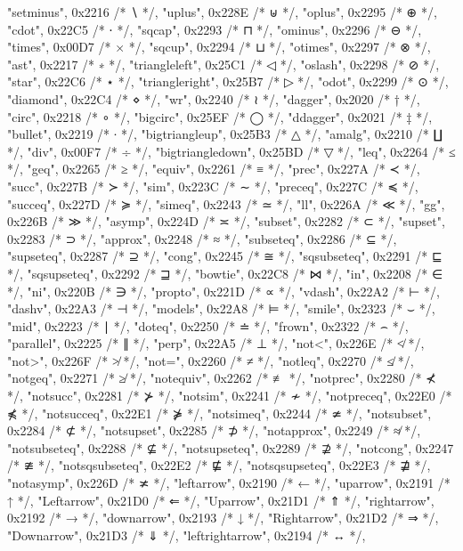 	{"setminus", 0x2216 /* ∖ */},
	{"uplus", 0x228E /* ⊎ */},
	{"oplus", 0x2295 /* ⊕ */},
	{"cdot", 0x22C5 /* ⋅ */},
	{"sqcap", 0x2293 /* ⊓ */},
	{"ominus", 0x2296 /* ⊖ */},
	{"times", 0x00D7 /* × */},
	{"sqcup", 0x2294 /* ⊔ */},
	{"otimes", 0x2297 /* ⊗ */},
	{"ast", 0x2217 /* ∗ */},
	{"triangleleft", 0x25C1 /* ◁ */},
	{"oslash", 0x2298 /* ⊘ */},
	{"star", 0x22C6 /* ⋆ */},
	{"triangleright", 0x25B7 /* ▷ */},
	{"odot", 0x2299 /* ⊙ */},
	{"diamond", 0x22C4 /* ⋄ */},
	{"wr", 0x2240 /* ≀ */},
	{"dagger", 0x2020 /* † */},
	{"circ", 0x2218 /* ∘ */},
	{"bigcirc", 0x25EF /* ◯ */},
	{"ddagger", 0x2021 /* ‡ */},
	{"bullet", 0x2219 /* ∙ */},
	{"bigtriangleup", 0x25B3 /* △ */},
	{"amalg", 0x2210 /* ∐ */},
	{"div", 0x00F7 /* ÷ */},
	{"bigtriangledown", 0x25BD /* ▽ */},
	{"leq", 0x2264 /* ≤ */},
	{"geq", 0x2265 /* ≥ */},
	{"equiv", 0x2261 /* ≡ */},
	{"prec", 0x227A /* ≺ */},
	{"succ", 0x227B /* ≻ */},
	{"sim", 0x223C /* ∼ */},
	{"preceq", 0x227C /* ≼ */},
	{"succeq", 0x227D /* ≽ */},
	{"simeq", 0x2243 /* ≃ */},
	{"ll", 0x226A /* ≪ */},
	{"gg", 0x226B /* ≫ */},
	{"asymp", 0x224D /* ≍ */},
	{"subset", 0x2282 /* ⊂ */},
	{"supset", 0x2283 /* ⊃ */},
	{"approx", 0x2248 /* ≈ */},
	{"subseteq", 0x2286 /* ⊆ */},
	{"supseteq", 0x2287 /* ⊇ */},
	{"cong", 0x2245 /* ≅ */},
	{"sqsubseteq", 0x2291 /* ⊑ */},
	{"sqsupseteq", 0x2292 /* ⊒ */},
	{"bowtie", 0x22C8 /* ⋈ */},
	{"in", 0x2208 /* ∈ */},
	{"ni", 0x220B /* ∋ */},
	{"propto", 0x221D /* ∝ */},
	{"vdash", 0x22A2 /* ⊢ */},
	{"dashv", 0x22A3 /* ⊣ */},
	{"models", 0x22A8 /* ⊨ */},
	{"smile", 0x2323 /* ⌣ */},
	{"mid", 0x2223 /* ∣ */},
	{"doteq", 0x2250 /* ≐ */},
	{"frown", 0x2322 /* ⌢ */},
	{"parallel", 0x2225 /* ∥ */},
	{"perp", 0x22A5 /* ⊥ */},
	{"not<", 0x226E /* ≮ */},
	{"not>", 0x226F /* ≯ */},
	{"not=", 0x2260 /* ≠ */},
	{"notleq", 0x2270 /* ≰ */},
	{"notgeq", 0x2271 /* ≱ */},
	{"notequiv", 0x2262 /* ≢ */},
	{"notprec", 0x2280 /* ⊀ */},
	{"notsucc", 0x2281 /* ⊁ */},
	{"notsim", 0x2241 /* ≁ */},
	{"notpreceq", 0x22E0 /* ⋠ */},
	{"notsucceq", 0x22E1 /* ⋡ */},
	{"notsimeq", 0x2244 /* ≄ */},
	{"notsubset", 0x2284 /* ⊄ */},
	{"notsupset", 0x2285 /* ⊅ */},
	{"notapprox", 0x2249 /* ≉ */},
	{"notsubseteq", 0x2288 /* ⊈ */},
	{"notsupseteq", 0x2289 /* ⊉ */},
	{"notcong", 0x2247 /* ≇ */},
	{"notsqsubseteq", 0x22E2 /* ⋢ */},
	{"notsqsupseteq", 0x22E3 /* ⋣ */},
	{"notasymp", 0x226D /* ≭ */},
	{"leftarrow", 0x2190 /* ← */},
	{"uparrow", 0x2191 /* ↑ */},
	{"Leftarrow", 0x21D0 /* ⇐ */},
	{"Uparrow", 0x21D1 /* ⇑ */},
	{"rightarrow", 0x2192 /* → */},
	{"downarrow", 0x2193 /* ↓ */},
	{"Rightarrow", 0x21D2 /* ⇒ */},
	{"Downarrow", 0x21D3 /* ⇓ */},
	{"leftrightarrow", 0x2194 /* ↔ */},
